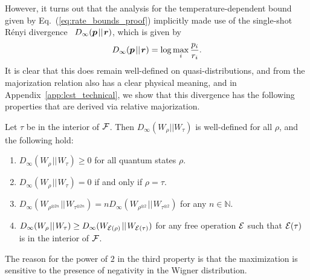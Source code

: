 \documentclass[pra,
aps,
twocolumn,
superscriptaddress,
groupedaddress,
nofootinbib,
reprint
]{revtex4-1}
\begin{document}
However, it turns out that the analysis for the temperature-dependent bound given by Eq.~(\ref{eq:rate_bounds_proof}) implicitly made use of the single-shot R\'{e}nyi divergence~\cite{renyi_1960} $D_\infty (\boldsymbol{p} \hspace{1pt}||\hspace{1pt} \boldsymbol{r})$, which is given by
\begin{equation}
	D_\infty (\boldsymbol{p} \hspace{1pt}||\hspace{1pt} \boldsymbol{r}) = \log \max_i \frac{p_i}{r_i}.
\end{equation}
It is clear that this does remain well-defined on quasi-distributions, and from the majorization relation also has a clear physical meaning, and in Appendix~\ref{app:lcst_technical}, we show that this divergence has the following properties that are derived via relative majorization.
\begin{theorem}\label{thm:Dinfty} 
	Let $\tau$ be in the interior of ${\mathcal F}$. Then $D_\infty(W_\rho || W_\tau)$ is well-defined for all $\rho$, and the following hold:
\begin{enumerate}
\item $D_\infty(W_\rho \hspace{1pt}||\hspace{1pt} W_\tau) \ge 0$ for all quantum states $\rho$.
\item  $D_\infty(W_\rho \hspace{1pt}||\hspace{1pt} W_\tau) = 0$ if and only if $\rho =\tau$.
\item $D_\infty(W_{\rho^{\otimes 2n}} \hspace{1pt}||\hspace{1pt} W_{\tau^{\otimes 2n}}) = n D_\infty(W_{\rho^{\otimes 2}} \hspace{1pt}||\hspace{1pt} W_{\tau^{\otimes 2}})$ for any $n \in \mathbb{N}$.
\item $D_\infty(W_\rho \hspace{1pt}||\hspace{1pt} W_\tau) \geq D_\infty(W_{{\mathcal E}(\rho)} \hspace{1pt}||\hspace{1pt} W_{{\mathcal E}(\tau)})$ for any free operation ${\mathcal E}$ such that ${\mathcal E}(\tau)$ is in the interior of ${\mathcal F}$.
\end{enumerate}
\end{theorem}
The reason for the power of $2$ in the third property is that the maximization is sensitive to the presence of negativity in the Wigner distribution.
\end{document}
